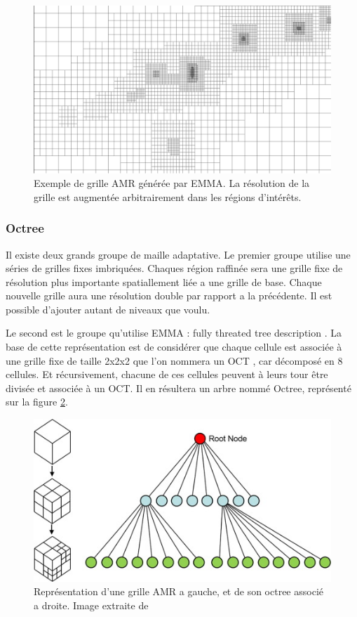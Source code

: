 \begin{figure}[bth]
        \includegraphics[width=.95\linewidth]{img/02/AMR.pdf} 
        \caption{Exemple de grille \ac{AMR} générée par EMMA. 
        La  résolution de la grille est augmentée arbitrairement dans les régions d'intérêts.
}
 		\label{fig:AMR}
\end{figure}



\subsubsection{Octree}

Il existe deux grands groupe de maille adaptative.
Le premier groupe utilise une séries de grilles fixes imbriquées. %
Chaques région raffinée sera une grille fixe de résolution plus importante spatiallement liée a une grille de base.
Chaque nouvelle grille aura une résolution double par rapport a la précédente.
Il est possible d'ajouter autant de niveaux que voulu.

Le second est le groupe qu'utilise EMMA : fully threated tree description \citep{khokhlov_fully_1998-1}.
La base de cette représentation est de considérer que chaque cellule est associée à une grille fixe de taille 2x2x2 que l'on nommera un OCT , car décomposé en 8 cellules.
Et récursivement, chacune de ces cellules peuvent à leurs tour être divisée et  associée à un OCT.
Il en résultera un arbre nommé Octree, représenté sur la figure \ref{fig:octree}.

\begin{figure}[bth]
        \includegraphics[width=.95\linewidth]{img/02/octree.jpg} 
        \caption{Représentation d'une grille AMR a gauche, et de son octree associé a droite. 
        Image extraite de \cite{SU201659}
     	\label{fig:octree}
}
\end{figure}

